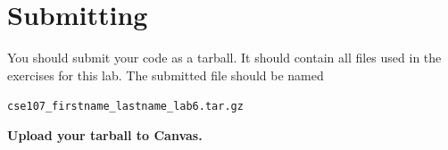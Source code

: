 \documentclass[11pt]{cselabheader}
\begin{document}
\section{Submitting}

You should submit your code as a tarball. It should contain all files
used in the exercises for this lab. The submitted file should be named
\begin{center}
  \texttt{cse107\_firstname\_lastname\_lab6.tar.gz}
\end{center}

\begin{center}
  \textbf{Upload your tarball to Canvas.}
\end{center}

\listoftheorems
\end{document}

